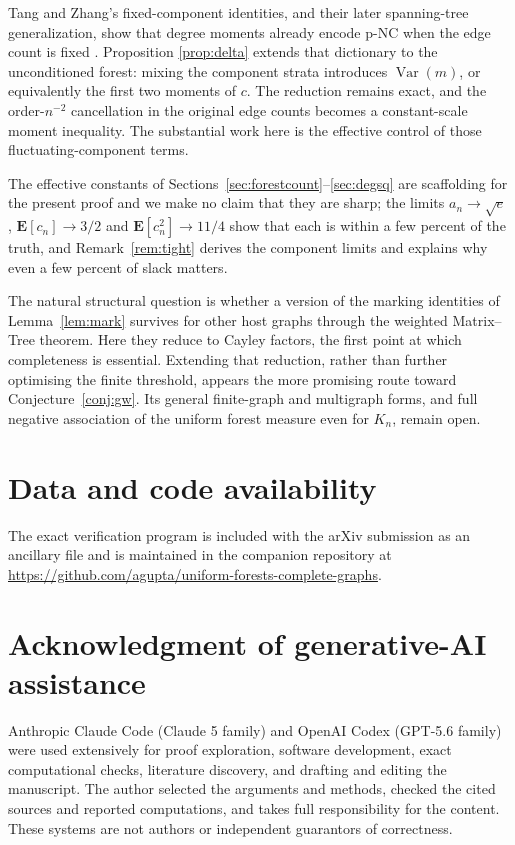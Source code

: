 \documentclass[11pt,a4paper]{amsart}
\theoremstyle{plain}
\theoremstyle{definition}
\newcommand{\EX}{\mathbf{E}}
\newcommand{\Var}{\operatorname{Var}}
\begin{document}
Tang and Zhang's fixed-component identities, and their later spanning-tree
generalization, show that degree moments already encode p-NC when the edge count
is fixed \cite{TZ2026a,TZ2026b}. Proposition
\ref{prop:delta} extends that dictionary to the unconditioned forest: mixing the
component strata introduces $\Var(m)$, or equivalently the first two moments of
$c$. The reduction remains exact, and the order-$n^{-2}$ cancellation in the
original edge counts becomes a constant-scale moment inequality. The substantial
work here is the effective control of those fluctuating-component terms.

The effective constants of Sections~\ref{sec:forestcount}--\ref{sec:degsq} are
scaffolding for the present proof and we make no claim that they are sharp; the
limits $a_n \to \sqrt e$ \cite{Renyi1959}, $\EX[c_n]\to 3/2$ and
$\EX[c_n^2]\to 11/4$ show that each is within a few percent of the truth, and
Remark~\ref{rem:tight} derives the component limits and explains why even a few
percent of slack matters.

The natural structural question is whether a version of the marking identities
of Lemma~\ref{lem:mark} survives for other host graphs through the weighted
Matrix--Tree theorem. Here they reduce to Cayley factors, the first point at
which completeness is essential. Extending that reduction, rather than further
optimising the finite threshold, appears the more promising route toward
Conjecture~\ref{conj:gw}. Its general finite-graph and multigraph forms, and full
negative association of the uniform forest measure even for $K_n$, remain open.

\section*{Data and code availability}
The exact verification program is included with the arXiv submission as an
ancillary file and is maintained in the companion repository at
\url{https://github.com/agupta/uniform-forests-complete-graphs}.

\section*{Acknowledgment of generative-AI assistance}
Anthropic Claude Code (Claude 5 family) and OpenAI Codex (GPT-5.6 family) were
used extensively for proof exploration, software development, exact
computational checks, literature discovery, and drafting and editing the
manuscript. The author selected the arguments and methods, checked the cited
sources and reported computations, and takes full responsibility for the
content. These systems are not authors or independent guarantors of
correctness.
\end{document}
